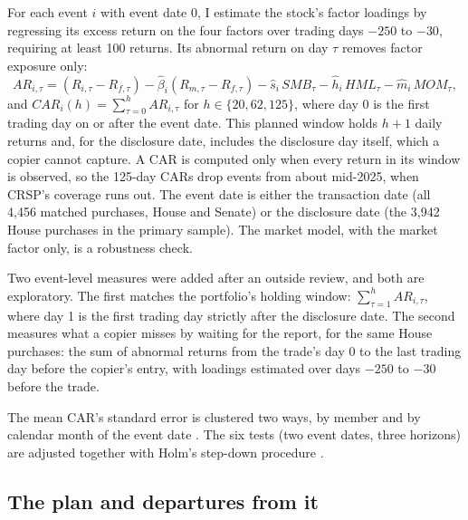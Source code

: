 \documentclass[11pt]{article}
\begin{document}
For each event $i$ with event date $0$, I estimate the stock's factor loadings by regressing its excess return on the four factors over trading days $-250$ to $-30$, requiring at least 100 returns. Its abnormal return on day $\tau$ removes factor exposure only:
\begin{equation}
AR_{i,\tau} = (R_{i,\tau} - R_{f,\tau}) - \hat\beta_i (R_{m,\tau} - R_{f,\tau}) - \hat s_i\,\mathit{SMB}_\tau - \hat h_i\,\mathit{HML}_\tau - \hat m_i\,\mathit{MOM}_\tau ,
\end{equation}
and $\mathit{CAR}_i(h) = \sum_{\tau=0}^{h} AR_{i,\tau}$ for $h \in \{20, 62, 125\}$, where day 0 is the first trading day on or after the event date. This planned window holds $h + 1$ daily returns and, for the disclosure date, includes the disclosure day itself, which a copier cannot capture. A CAR is computed only when every return in its window is observed, so the 125-day CARs drop events from about mid-2025, when CRSP's coverage runs out. The event date is either the transaction date (all 4,456 matched purchases, House and Senate) or the disclosure date (the 3,942 House purchases in the primary sample). The market model, with the market factor only, is a robustness check.

Two event-level measures were added after an outside review, and both are exploratory. The first matches the portfolio's holding window: $\sum_{\tau=1}^{h} AR_{i,\tau}$, where day 1 is the first trading day strictly after the disclosure date. The second measures what a copier misses by waiting for the report, for the same House purchases: the sum of abnormal returns from the trade's day 0 to the last trading day before the copier's entry, with loadings estimated over days $-250$ to $-30$ before the trade.

The mean CAR's standard error is clustered two ways, by member and by calendar month of the event date \citep{cameron2011robust}. The six tests (two event dates, three horizons) are adjusted together with Holm's step-down procedure \citep{holm1979simple}.

\subsection{The plan and departures from it}\label{sec:plan}
\end{document}
